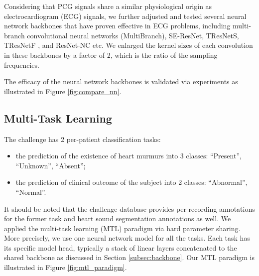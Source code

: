 


Considering that PCG signals share a similar physiological origin as electrocardiogram (ECG) signals, we further adjusted and tested several neural network backbones that have proven effective in ECG problems, including multi-branch convolutional neural networks (MultiBranch), SE-ResNet, TResNetS, TResNetF \cite{Kang_2022_cinc2021_iop}, and ResNet-NC \cite{ribeiro2020automatic} etc. We enlarged the kernel sizes of each convolution in these backbones by a factor of 2, which is the ratio of the sampling frequencies.

The efficacy of the neural network backbones is validated via experiments as illustrated in Figure \ref{fig:compare_nn}.



\subsection{Multi-Task Learning}
\label{subsec:mtl}

The challenge \cite{cinc2022} has 2 per-patient classification tasks:
\begin{itemize}
    \item the prediction of the existence of heart murmurs into 3 classes: ``Present'', ``Unknown'', ``Absent'';
    \item the prediction of clinical outcome of the subject into 2 classes: ``Abnormal'', ``Normal''.
\end{itemize}

It should be noted that the challenge database \cite{Oliveira_2021_CirCor} provides per-recording annotations for the former task and heart sound segmentation annotations as well. We applied the multi-task learning (MTL) paradigm \cite{Caruana_1997_mtl} via hard parameter sharing. More precisely, we use one neural network model for all the tasks. Each task has its specific model head, typically a stack of linear layers concatenated to the shared backbone as discussed in Section \ref{subsec:backbone}. Our MTL paradigm is illustrated in Figure \ref{fig:mtl_paradigm}.





